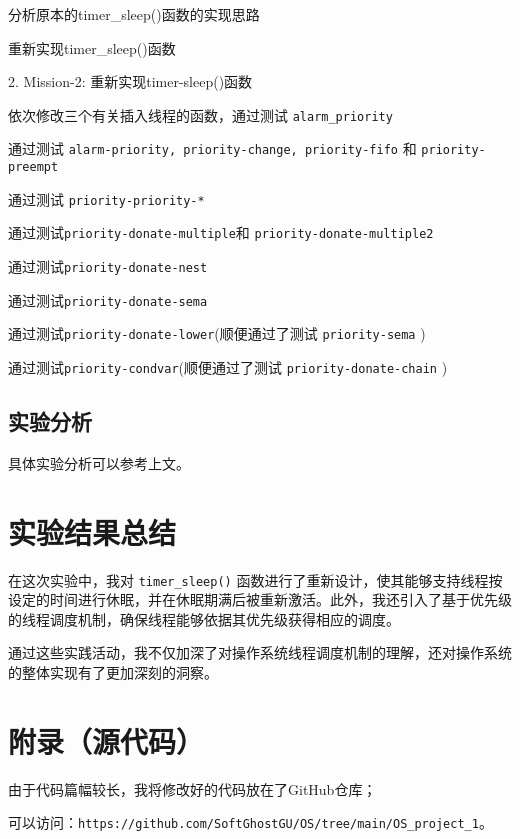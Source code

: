 \documentclass{article}
\begin{document}
	\setlength{\parindent}{4em}
	
	分析原本的timer\_sleep()函数的实现思路
	
	重新实现timer\_sleep()函数
	
	\setlength{\parindent}{2em}
	
	2. Mission-2: 重新实现timer-sleep()函数
	
	\setlength{\parindent}{4em}
	
	依次修改三个有关插入线程的函数，通过测试 \texttt{alarm\_priority}
	
	通过测试 \texttt{alarm-priority, priority-change, priority-fifo} 和 \texttt{priority-preempt}
	
	通过测试 \texttt{priority-priority-*}
	
	通过测试\texttt{priority-donate-multiple}和 \texttt{priority-donate-multiple2}
	
	通过测试\texttt{priority-donate-nest}
	
	通过测试\texttt{priority-donate-sema}
	
	通过测试\texttt{priority-donate-lower}(顺便通过了测试 \texttt{priority-sema} )
	
	通过测试\texttt{priority-condvar}(顺便通过了测试 \texttt{priority-donate-chain} )
	
	\setlength{\parindent}{2em}
	
	\subsection{实验分析}
	
	具体实验分析可以参考上文。
	
	\section{实验结果总结}
	
	在这次实验中，我对 \texttt{timer\_sleep()} 函数进行了重新设计，使其能够支持线程按设定的时间进行休眠，并在休眠期满后被重新激活。此外，我还引入了基于优先级的线程调度机制，确保线程能够依据其优先级获得相应的调度。
	
	通过这些实践活动，我不仅加深了对操作系统线程调度机制的理解，还对操作系统的整体实现有了更加深刻的洞察。
	
	\section{附录（源代码）}
	
	由于代码篇幅较长，我将修改好的代码放在了GitHub仓库；
	
	可以访问：\texttt{https://github.com/SoftGhostGU/OS/tree/main/OS\_project\_1}。
	
\end{document}

